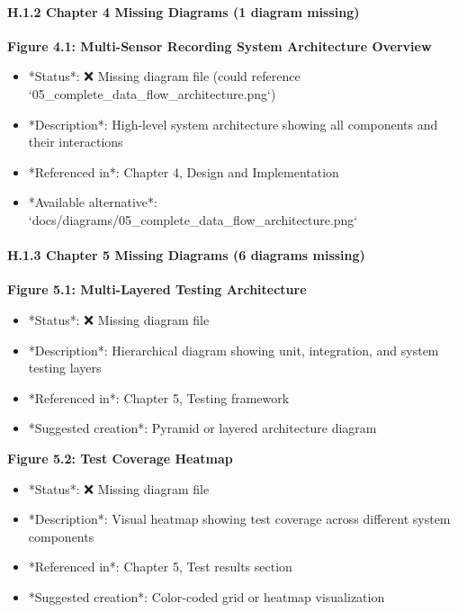 \documentclass[11pt,a4paper]{article}
\begin{document}
{{\begin{itemize}
\end{itemize}
\paragraph{H.1.2 Chapter 4 Missing Diagrams (1 diagram missing)}

\textbf{Figure 4.1: Multi-Sensor Recording System Architecture Overview}

\begin{itemize}
\item *Status*: ❌ Missing diagram file (could reference `05_complete_data_flow_architecture.png`)
\item *Description*: High-level system architecture showing all components and their interactions
\item *Referenced in*: Chapter 4, Design and Implementation
\item *Available alternative*: `docs/diagrams/05_complete_data_flow_architecture.png`

\end{itemize}
\paragraph{H.1.3 Chapter 5 Missing Diagrams (6 diagrams missing)}

\textbf{Figure 5.1: Multi-Layered Testing Architecture}

\begin{itemize}
\item *Status*: ❌ Missing diagram file
\item *Description*: Hierarchical diagram showing unit, integration, and system testing layers
\item *Referenced in*: Chapter 5, Testing framework
\item *Suggested creation*: Pyramid or layered architecture diagram

\end{itemize}
\textbf{Figure 5.2: Test Coverage Heatmap}

\begin{itemize}
\item *Status*: ❌ Missing diagram file
\item *Description*: Visual heatmap showing test coverage across different system components
\item *Referenced in*: Chapter 5, Test results section
\item *Suggested creation*: Color-coded grid or heatmap visualization


\end{itemize}}}
\end{document}
